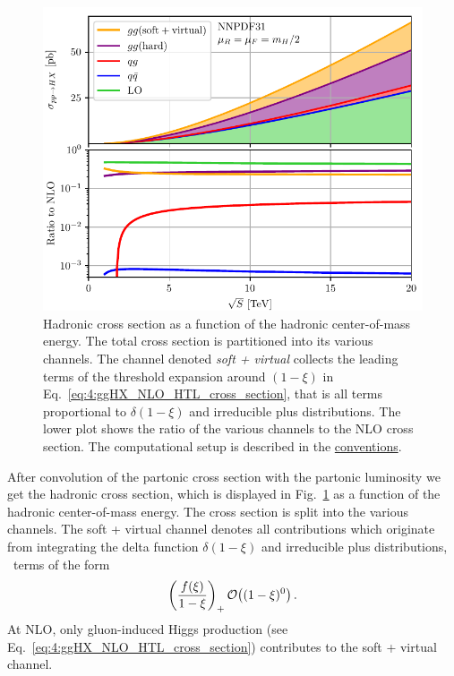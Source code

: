 \begin{figure}[ht]
\centering
\includegraphics[width=\figurewidth]{Images/channel_comparison_HTL_NLO.pdf}
\caption{Hadronic cross section as a function of the hadronic center-of-mass energy. The total cross section is partitioned into its various channels. The channel denoted \textit{soft + virtual} collects the leading terms of the threshold expansion around $(1 - \xi)$ in Eq.~\eqref{eq:4:ggHX_NLO_HTL_cross_section}, that is all terms proportional to $\delta (1 - \xi)$ and irreducible plus distributions. The lower plot shows the ratio of the various channels to the \acs{NLO} cross section. The computational setup is described in the \hyperref[chap:notation_and_conventions]{conventions}.}
\label{fig:4:channel_comparison}
\end{figure}
After convolution of the partonic cross section with the partonic luminosity we get the hadronic cross section, which is displayed in Fig.~\ref{fig:4:channel_comparison} as a function of the hadronic center-of-mass energy. The cross section is split into the various channels. The soft + virtual channel denotes all contributions which originate from integrating the delta function $\delta (1 - \xi)$ and irreducible plus distributions, \ie\ terms of the form
\begin{equation}
\left(\frac{f(\xi)}{1 - \xi} \right)_+ \mathcal{O}\!\left((1 - \xi)^0\right).
\end{equation}
At \acs{NLO}, only gluon-induced Higgs production (see Eq.~\eqref{eq:4:ggHX_NLO_HTL_cross_section}) contributes to the soft + virtual channel.

